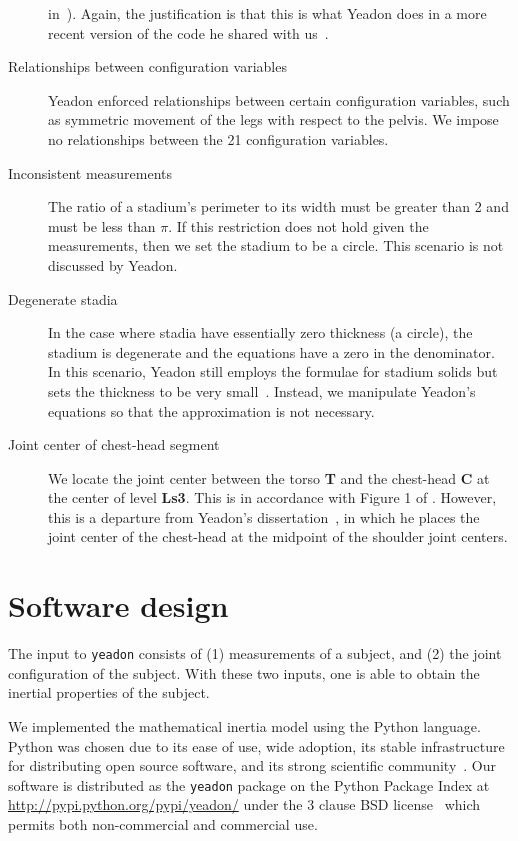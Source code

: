 \documentclass[10pt]{article}
\begin{document}
\begin{description}
        in~\cite{Yeadon1984a}). Again, the justification is that this is what
        Yeadon does in a more recent version of the code he shared with
        us~\cite{Yeadon2011}.
    \item[Relationships between configuration variables] Yeadon enforced
        relationships between certain configuration variables, such as
        symmetric movement of the legs with respect to the pelvis. We impose no
        relationships between the 21 configuration variables.
    \item[Inconsistent measurements] The ratio of a stadium's perimeter to its
        width must be greater than 2 and must be less than $\pi$. If this
        restriction does not hold given the measurements, then we set the
        stadium to be a circle. This scenario is not discussed by Yeadon.
    \item[Degenerate stadia] In the case where stadia have essentially zero
        thickness (a circle), the stadium is degenerate and the equations have
        a zero in the denominator. In this scenario, Yeadon still employs the
        formulae for stadium solids but sets the thickness to be very
        small~\cite{Yeadon1990f}.  Instead, we manipulate Yeadon's equations so
        that the approximation is not necessary.
    \item[Joint center of chest-head segment] We locate the joint center
        between the torso \textbf{T} and the chest-head \textbf{C} at the
        center of level \textbf{Ls3}. This is in accordance with Figure 1 of
        \cite{Yeadon1990e}. However, this is a departure from Yeadon's
        dissertation~\cite{Yeadon1984a}, in which he places the joint center of
        the chest-head at the midpoint of the shoulder joint centers.
\end{description}

\section*{Software design}

The input to \verb+yeadon+ consists of (1) measurements of a subject, and (2)
the joint configuration of the subject. With these two inputs, one is able to
obtain the inertial properties of the subject.

We implemented the mathematical inertia model using the Python language.
Python was chosen due to its ease of use, wide adoption, its stable
infrastructure for distributing open source software, and its strong scientific
community~\cite{SciPy2014}. Our software is distributed as the \verb+yeadon+
package on the Python Package Index at
\url{http://pypi.python.org/pypi/yeadon/} under the 3 clause BSD
license~\cite{BSD2014} which permits both non-commercial and commercial use.
\end{document}
